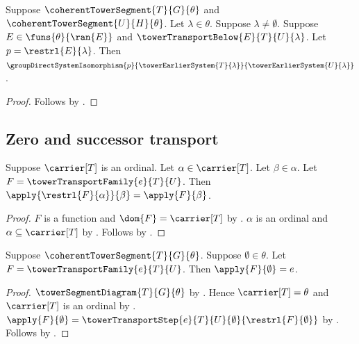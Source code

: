 \begin{theorem}\label{tower_transport_below_system_isomorphism}
    Suppose $\coherentTowerSegment{T}{G}{\theta}$ and
        $\coherentTowerSegment{U}{H}{\theta}$.
    Let $\lambda\in\theta$.
    Suppose $\lambda\neq\emptyset$.
    Suppose $E\in\funs{\theta}{\ran{E}}$ and
        $\towerTransportBelow{E}{T}{U}{\lambda}$.
    Let $p=\restrl{E}{\lambda}$.
    Then $\groupDirectSystemIsomorphism{p}
        {\towerEarlierSystem{T}{\lambda}}
        {\towerEarlierSystem{U}{\lambda}}$.
\end{theorem}
\begin{proof}
    Follows by
        .
\end{proof}

\subsection{Zero and successor transport}

\begin{proposition}\label{tower_transport_family_restriction_apply}
    Suppose $\carrier[T]$ is an ordinal.
    Let $\alpha\in\carrier[T]$.
    Let $\beta\in\alpha$.
    Let $F=\towerTransportFamily{e}{T}{U}$.
    Then $\apply{\restrl{F}{\alpha}}{\beta}=\apply{F}{\beta}$.
\end{proposition}
\begin{proof}
    $F$ is a function and $\dom{F}=\carrier[T]$ by
        .
    $\alpha$ is an ordinal and $\alpha\subseteq\carrier[T]$ by
        .
    Follows by .
\end{proof}

\begin{proposition}\label{tower_transport_family_zero_equation}
    Suppose $\coherentTowerSegment{T}{G}{\theta}$.
    Suppose $\emptyset\in\theta$.
    Let $F=\towerTransportFamily{e}{T}{U}$.
    Then $\apply{F}{\emptyset}=e$.
\end{proposition}
\begin{proof}
    $\towerSegmentDiagram{T}{G}{\theta}$ by
        .
    Hence $\carrier[T]=\theta$ and $\carrier[T]$ is an ordinal by
        .
    $\apply{F}{\emptyset}=
        \towerTransportStep{e}{T}{U}{\emptyset}{\restrl{F}{\emptyset}}$ by
        .
    Follows by .
\end{proof}

